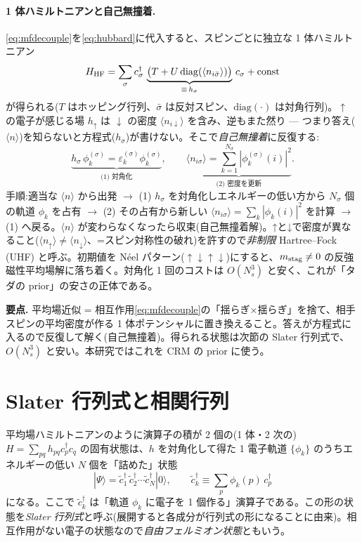 \documentclass[11pt,a4paper]{ltjsarticle}
\newcommand{\ket}[1]{|#1\rangle}
\newcommand{\ev}[1]{\langle #1\rangle}
\newcommand{\cd}{c^\dagger}
\newcommand{\up}{\uparrow}
\newcommand{\dn}{\downarrow}
\begin{document}
\paragraph{1 体ハミルトニアンと自己無撞着.}\eqref{eq:mfdecouple}を\eqref{eq:hubbard}に代入すると、スピンごとに独立な 1 体ハミルトニアン
\begin{equation}
  H_{\rm HF} = \sum_\sigma \cd_\sigma\,\underbrace{\bigl(T + U\,\mathrm{diag}(\ev{n_{i\bar\sigma}})\bigr)}_{\equiv\,h_\sigma}\,c_\sigma + \text{const}
\end{equation}
が得られる($T$ はホッピング行列、$\bar\sigma$ は反対スピン、$\mathrm{diag}(\cdot)$ は対角行列)。$\up$ の電子が感じる場 $h_\up$ は $\dn$ の密度 $\ev{n_{i\dn}}$ を含み、逆もまた然り — つまり答え($\ev{n}$)を知らないと方程式($h_\sigma$)が書けない。そこで\emph{自己無撞着}に反復する:
\begin{equation}
  \underbrace{h_\sigma\,\phi^{(\sigma)}_k = \varepsilon^{(\sigma)}_k \phi^{(\sigma)}_k}_{\text{(1) 対角化}},\qquad
  \underbrace{\ev{n_{i\sigma}} = \sum_{k=1}^{N_\sigma} |\phi^{(\sigma)}_{k}(i)|^2}_{\text{(2) 密度を更新}}.
\end{equation}
手順:適当な $\ev{n}$ から出発 $\to$ (1) $h_\sigma$ を対角化しエネルギーの低い方から $N_\sigma$ 個の軌道 $\phi_k$ を占有 $\to$ (2) その占有から新しい $\ev{n_{i\sigma}}=\sum_k|\phi_k(i)|^2$ を計算 $\to$ (1) へ戻る。$\ev{n}$ が変わらなくなったら収束(自己無撞着解)。↑と↓で密度が異なること($\ev{n_\up}\neq\ev{n_\dn}$、=スピン対称性の破れ)を許すので\emph{非制限} Hartree--Fock (UHF) と呼ぶ。初期値を Néel パターン($\up\dn\up\dn$)にすると、$m_{\rm stag}\neq0$ の反強磁性平均場解に落ち着く。対角化 1 回のコストは $O(N_s^3)$ と安く、これが「タダの prior」の安さの正体である。

\begin{keybox}
\textbf{要点.} 平均場近似 = 相互作用\eqref{eq:mfdecouple}の「揺らぎ$\times$揺らぎ」を捨て、相手スピンの平均密度が作る 1 体ポテンシャルに置き換えること。答えが方程式に入るので反復して解く(自己無撞着)。得られる状態は次節の Slater 行列式で、$O(N_s^3)$ と安い。本研究ではこれを CRM の prior に使う。
\end{keybox}

\section{Slater 行列式と相関行列}
\label{sec:slater}

平均場ハミルトニアンのように演算子の積が 2 個の(1 体・2 次の)$H=\sum_{pq}h_{pq}\cd_p c_q$ の固有状態は、$h$ を対角化して得た 1 電子軌道 $\{\phi_k\}$ のうちエネルギーの低い $N$ 個を「詰めた」状態
\begin{equation}
  \ket{\Psi} = \tilde c_1^\dagger\,\tilde c_2^\dagger\cdots \tilde c_N^\dagger\ket{0},\qquad
  \tilde c_k^\dagger \equiv \sum_p \phi_{k}(p)\,\cd_p
\end{equation}
になる。ここで $\tilde c_k^\dagger$ は「軌道 $\phi_k$ に電子を 1 個作る」演算子である。この形の状態を\emph{Slater 行列式}と呼ぶ(展開すると各成分が行列式の形になることに由来)。相互作用がない電子の状態なので\emph{自由フェルミオン状態}ともいう。
\end{document}
